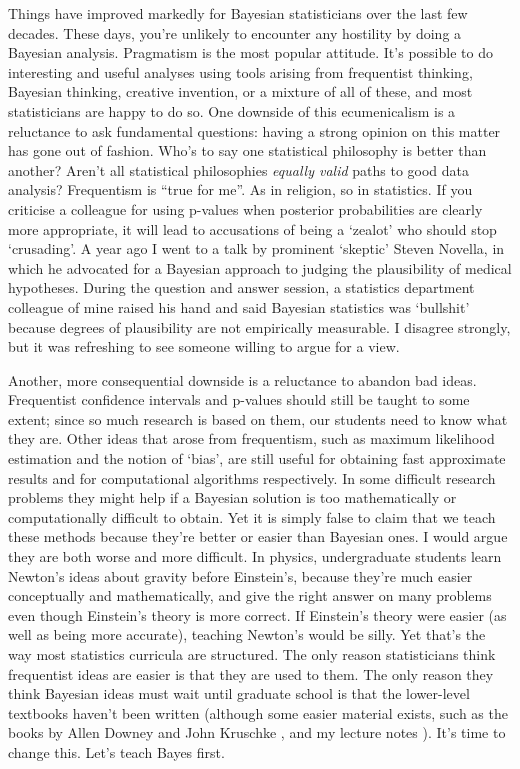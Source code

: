 \documentclass[a4paper, 12pt]{article}
\begin{document}
Things have improved markedly for Bayesian statisticians over the last few
decades. These days, you're unlikely to encounter any hostility by doing
a Bayesian analysis. Pragmatism is the most popular attitude.
It's possible to do interesting and useful analyses using tools
arising from frequentist thinking, Bayesian thinking, creative invention, or
a mixture of all of these, and most statisticians are happy to do so.
One downside of this ecumenicalism is a reluctance to ask fundamental
questions: having a strong opinion on this matter has gone out of fashion.
Who's to say one statistical philosophy is better than
another? Aren't all statistical philosophies {\it equally valid} paths to good
data analysis? Frequentism is ``true for me''. As in religion, so in statistics.
If you criticise a colleague for using p-values when posterior probabilities
are clearly more appropriate, it will lead to accusations of being a `zealot'
\citep{simply_statistics} who should stop `crusading'.
A year ago I went to a talk by prominent `skeptic' Steven Novella, in which
he advocated for a Bayesian approach to judging the plausibility of medical
hypotheses. During the question and answer session, a statistics department colleague of mine raised his hand and said Bayesian statistics was `bullshit' because degrees of plausibility are not empirically measurable. I disagree
strongly, but it was refreshing to see someone willing to argue for a view.

Another, more consequential downside is a reluctance to abandon bad ideas.
Frequentist confidence intervals and p-values should still be taught to some
extent; since so much research is based on them, our students need to know what
they are. Other ideas that arose from frequentism, such as maximum likelihood
estimation and the notion of `bias', are still useful for obtaining fast
approximate results and for computational algorithms respectively.
In some difficult research problems they might help if a Bayesian solution is too mathematically or computationally difficult to obtain.
Yet it is simply false to claim that we teach these methods because they're
better or easier than Bayesian ones. I would argue they are both worse and
more difficult. In physics, undergraduate students learn Newton's ideas about
gravity before Einstein's, because they're much easier conceptually and
mathematically, and give the right answer on many problems even though
Einstein's theory is more correct. If Einstein's theory
were easier (as well as being more accurate), teaching Newton's would be silly. Yet
that's the way most statistics curricula are structured.
The only reason
statisticians think frequentist ideas are easier is that they are used to them.
The only reason they think Bayesian ideas must wait until graduate school is
that the lower-level textbooks haven't been written (although some easier material
exists, such as the books by Allen Downey \citep{downey} and John Kruschke
\citep{kruschke},
and my lecture
notes \citep{331}). It's time to change this. Let's teach Bayes first.
\end{document}
